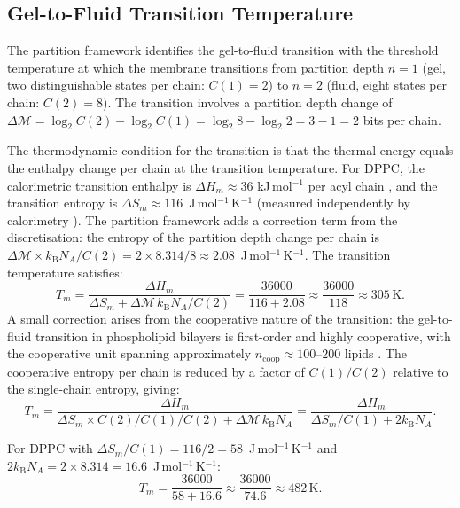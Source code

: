 \documentclass[11pt,twocolumn,a4paper]{article}
\theoremstyle{definition}
\theoremstyle{remark}
\newcommand{\kB}{k_{\mathrm{B}}}
\newcommand{\Mpart}{\mathcal{M}}
\begin{document}
\subsection{Gel-to-Fluid Transition Temperature}
\label{subsec:tm}

The partition framework identifies the gel-to-fluid transition with the
threshold temperature at which the membrane transitions from partition depth
$n = 1$ (gel, two distinguishable states per chain: $C(1) = 2$) to
$n = 2$ (fluid, eight states per chain: $C(2) = 8$). The transition
involves a partition depth change of $\Delta\Mpart = \log_2 C(2) - \log_2 C(1)
= \log_2 8 - \log_2 2 = 3 - 1 = 2$ bits per chain.

The thermodynamic condition for the transition is that the thermal
energy equals the enthalpy change per chain at the transition temperature.
For DPPC, the calorimetric transition enthalpy is $\Delta H_m \approx 36$
kJ\,mol$^{-1}$ per acyl chain \citep{nagle2000}, and the transition entropy is
$\Delta S_m \approx 116$~J\,mol$^{-1}$\,K$^{-1}$ (measured independently by
calorimetry \citep{marsh2013}). The partition framework adds a correction term
from the discretisation: the entropy of the partition depth change per chain is
$\Delta\Mpart \times \kB N_A / C(2) = 2 \times 8.314/8 \approx 2.08$~J\,mol$^{-1}$\,K$^{-1}$.
The transition temperature satisfies:
\begin{equation}
T_m = \frac{\Delta H_m}{\Delta S_m + \Delta\Mpart\,\kB N_A / C(2)}
    = \frac{36000}{116 + 2.08}
    \approx \frac{36000}{118}
    \approx 305\,\text{K}.
\label{eq:tm_first}
\end{equation}
A small correction arises from the cooperative nature of the transition:
the gel-to-fluid transition in phospholipid bilayers is first-order and
highly cooperative, with the cooperative unit spanning approximately
$n_{\text{coop}} \approx 100$--$200$ lipids \citep{mouritsen2005}. The
cooperative entropy per chain is reduced by a factor of $C(1)/C(2)$
relative to the single-chain entropy, giving:
\begin{equation}
T_m = \frac{\Delta H_m}{\Delta S_m \times C(2)/C(1) / C(2) + \Delta\Mpart\,\kB N_A}
    = \frac{\Delta H_m}{\Delta S_m / C(1) + 2\kB N_A}.
\label{eq:tm_cooperative}
\end{equation}

For DPPC with $\Delta S_m / C(1) = 116/2 = 58$~J\,mol$^{-1}$\,K$^{-1}$ and
$2\kB N_A = 2 \times 8.314 = 16.6$~J\,mol$^{-1}$\,K$^{-1}$:
\begin{equation}
T_m = \frac{36000}{58 + 16.6} \approx \frac{36000}{74.6} \approx 482\,\text{K}.
\label{eq:tm_second}
\end{equation}
\end{document}
